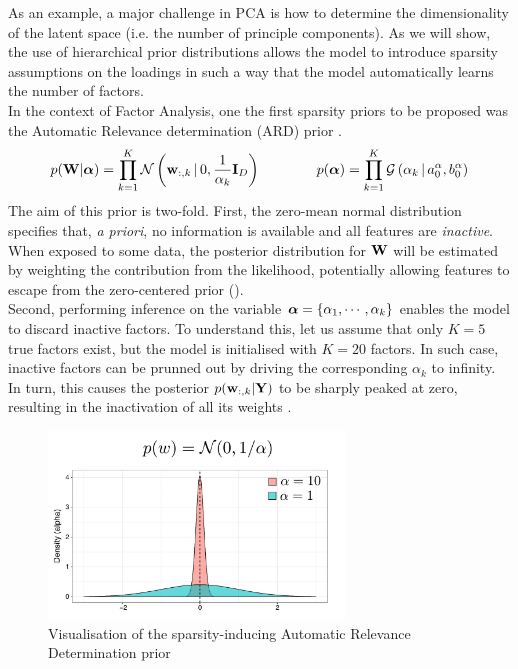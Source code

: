As an example, a major challenge in PCA is how to determine the dimensionality of the latent space (i.e. the number of principle components). As we will show, the use of hierarchical prior distributions allows the model to introduce sparsity assumptions on the loadings in such a way that the model automatically learns the number of factors.\\
In the context of Factor Analysis, one the first sparsity priors to be proposed was the Automatic Relevance determination (ARD) prior \cite{Neal1995,Mackay1996,Bishop1999a,Bishop1999b}. 
\begin{equation*} \label{eq:ard}
	p({\bf W}|\mbox{\boldmath $\alpha$}) = \prod_{k=1}^{K} \mathcal{N}\left({\bf w}_{:,k} \,|\, 0,\frac{1}{\alpha_{k}}{\bf I}_{D}\right) \\
	\qquad\qquad
	p(\mbox{\boldmath $\alpha$}) = \prod_{k=1}^{K} \mathcal{G}\left(\alpha_k \,|\, a_0^\alpha, b_0^\alpha\right)
\end{equation*}
The aim of this prior is two-fold. First, the zero-mean normal distribution specifies that, \textit{a priori}, no information is available and all features are \textit{inactive}. When exposed to some data, the posterior distribution for ${\bf W}$ will be estimated by weighting the contribution from the likelihood, potentially allowing features to escape from the zero-centered prior ().\\
Second, performing inference on the variable $\mbox{\boldmath $\alpha$} = \{ \alpha_1, \cdots, \alpha_k \}$ enables the model to discard inactive factors. To understand this, let us assume that only $K=5$ true factors exist, but the model is initialised with $K=20$ factors. In such case, inactive factors can be prunned out by driving the corresponding $\alpha_k$ to infinity. In turn, this causes the posterior $p({\bf w}_{:,k}|{\bf Y})$ to be sharply peaked at zero, resulting in the inactivation of all its weights .

\begin{figure}[H] \begin{center}
	\includegraphics[width=0.7\textwidth]{Chapter2/Figs/ard}
	\caption{Visualisation of the sparsity-inducing Automatic Relevance Determination prior}
	\label{fig:ard}
\end{center} \end{figure}


